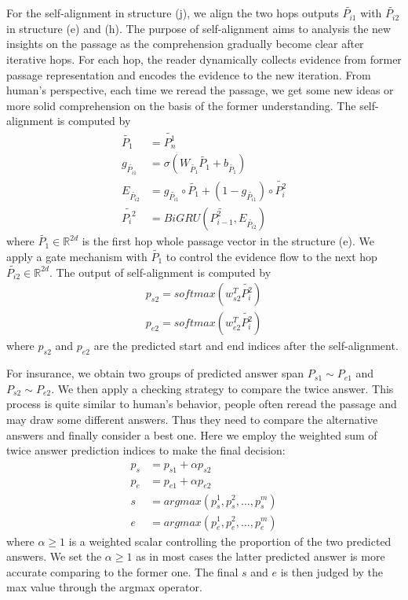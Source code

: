 \documentclass[letterpaper]{article} \usepackage{aaai18}  \usepackage{times}  \usepackage{helvet}  \usepackage{courier}  \usepackage{url}  \usepackage{graphicx}  \usepackage{booktabs}
\begin{document}
For the self-alignment in structure (j), we align the two hops outputs $\widetilde{P_{i1}}$ with $\widetilde{P_{i2}}$ in structure (e) and (h). The purpose of self-alignment aims to analysis the new insights on the passage as the comprehension gradually become clear after iterative hops. For each hop, the reader dynamically collects evidence from former passage representation and encodes the evidence to the new iteration. From human's perspective, each time we reread the passage, we get some new ideas or more solid comprehension on the basis of the former understanding. The self-alignment is computed by
\begin{align*}
\widetilde{P_{1}}&= \widetilde{P_{n}^1} \\
g_{\widetilde{P_{i1}}}&=\sigma(W_{\widetilde{P_{1}}}\widetilde{P_{1}}+b_{\widetilde{P_{1}}})\\
E_{\widetilde{P_{i2}}}&=g_{\widetilde{P_{i1}}}\circ  \widetilde{P_{1}}+(1-g_{\widetilde{P_{i1}}})\circ \widetilde{P_i^2}\\
\widetilde{{P_i}^2}&=BiGRU(\widetilde{P_{i-1}^2},E_{\widetilde{P_{i2}}}) \tag{9}
\end{align*} 
where $\widetilde{P_{1}}\in \mathbb{R}^{2d}$ is the first hop whole passage vector in the structure (e). We apply a gate mechanism with $\widetilde{P_{1}}$ to control the evidence flow to the next hop $\widetilde{P_{i2}} \in \mathbb{R}^{2d}$. The output of self-alignment is computed by
\begin{align*}
p_{s2}=softmax(w^T_{s2}\widetilde{P_i^2})\\
p_{e2}=softmax(w^T_{e2}\widetilde{P_i^2}) \tag{10}
\end{align*}
 where $p_{s2}$ and $p_{e2}$ are the predicted start and end indices after the self-alignment.
 
 For insurance, we obtain two groups of predicted answer span $P_{s1}\sim P_{e1}$ and $P_{s2}\sim P_{e2}$. We then apply a checking strategy to compare the twice answer. This process is quite similar to human's behavior, people often reread the passage and may draw some different answers. Thus they need to compare the alternative answers and finally consider a best one. Here we employ the weighted sum of twice answer prediction indices to make the final decision:
 \begin{align*}
 p_{s}&=p_{s1}+\alpha p_{s2}\\
 p_{e}&=p_{e1}+\alpha p_{e2}\\
 s&=argmax(p_s^1,p_s^2,...,p_s^m) \\
 e&=argmax(p_e^1,p_e^2,...,p_e^m) \tag{11}
 \end{align*} 
 where $\alpha \geq 1$ is a weighted scalar controlling the proportion of the two predicted answers. We set the $\alpha \geq 1$ as in most cases the latter predicted answer is more accurate comparing to the former one. The final $s$ and $e$ is then judged by the max value through the argmax operator.  
 
\end{document}
